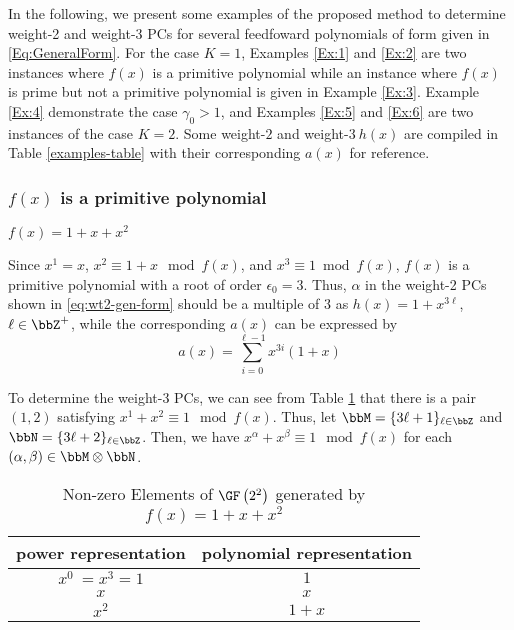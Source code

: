 In the following, we present some examples of the proposed method to determine weight-2 and weight-3 PCs for several feedfoward polynomials of form given in \eqref{Eq:GeneralForm}. For the case $K=1$, Examples \ref{Ex:1} and \ref{Ex:2} are two instances where $f(x)$ is a primitive polynomial while an instance where $f(x)$ is prime but not a primitive polynomial is given in Example \ref{Ex:3}. Example \ref{Ex:4} demonstrate the case $\gamma_0 > 1$, and Examples \ref{Ex:5} and \ref{Ex:6} are two instances of the case $K=2$. Some weight-$2$ and weight-$3 ~ h(x)$ are compiled in Table \ref{examples-table} with their corresponding $a(x)$ for reference.

\subsubsection{$f(x)$ is a primitive polynomial}

\begin{example}$f(x)=1+x+x^2$
	
Since $x^1=x$, $x^2 \equiv 1+x \mod f(x)$, and $x^3 \equiv 1 \bmod f(x)$, $f(x)$ is a primitive polynomial with a root of order $\epsilon_0=3$. Thus, $\alpha$ in the weight-2 PCs shown in \eqref{eq:wt2-gen-form} should be a multiple of $3$ as $h(x)=1+x^{3\ell}$, $\ell \in \bbZ^+$, while the corresponding $a(x)$ can be expressed by 
\begin{equation*}
	a(x)=\sum_{i=0}^{\ell-1} x^{3i}(1+x)
\end{equation*}

To determine the weight-3 PCs, we can see from Table \ref{novelTab7} that there is a pair $(1,2)$ satisfying $x^1+x^2 \equiv 1 \mod f(x)$. Thus, let $\bbM = \{3\ell+1\}_{\ell \in \bbZ}$ and $\bbN = \{3\ell+2\}_{\ell \in \bbZ}$. Then, we have $x^\alpha+x^\beta \equiv 1 \mod f(x)$ for each $(\alpha,\beta) \in \bbM\otimes\bbN$.
\label{Ex:1}
\end{example}

\begin{table}[htbp]
	\caption{Non-zero Elements of $\GF \left(2^2\right)$ generated by $f(x)=1+x+x^2$}
	\centering
	\begin{tabular}{c c} 
		\toprule
		power representation & polynomial representation \\ [0.5ex] 
		\midrule
		$x^0~=x^3=1$ & $1$\\
		\hline
		$x$ & $x$\\
		\hline
		$x^2$ &  $1+x$\\
		\bottomrule
	\end{tabular}
	\label{novelTab7}
\end{table}

